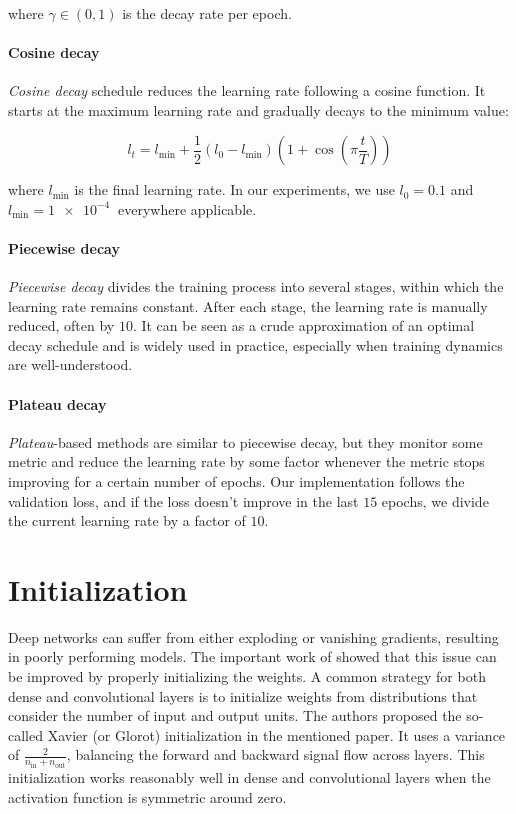where $\gamma \in (0,1)$ is the decay rate per epoch.

\paragraph{Cosine decay}
\emph{Cosine decay} schedule reduces the learning rate following a cosine function. It starts at the maximum learning rate and gradually decays to the minimum value:

\begin{equation} 
	\label{eq:cosine-decay} 
	l_t = l_{\mathrm{min}} + \frac{1}{2}(l_0 - l_{\mathrm{min}}) \left(1 + \cos\left( \pi \frac{t}{T} \right) \right)
\end{equation}

where $l_{\mathrm{min}}$ is the final learning rate. In our experiments, we use $l_0 = 0.1$ and $l_{\mathrm{min}} = \SI{1e-4}{}$ everywhere applicable.

\paragraph{Piecewise decay}
\emph{Piecewise decay} divides the training process into several stages, within which the learning rate remains constant. After each stage, the learning rate is manually reduced, often by $10$. It can be seen as a crude approximation of an optimal decay schedule and is widely used in practice, especially when training dynamics are well-understood.

\paragraph{Plateau decay}
\emph{Plateau}-based methods are similar to piecewise decay, but they monitor some metric and reduce the learning rate by some factor whenever the metric stops improving for a certain number of epochs. Our implementation follows the validation loss, and if the loss doesn't improve in the last $15$ epochs, we divide the current learning rate by a factor of $10$.

\section{Initialization}
\label{sec:init}

Deep networks can suffer from either exploding or vanishing gradients, resulting in poorly performing models. The important work of \cite{glorot2010understanding} showed that this issue can be improved by properly initializing the weights. A common strategy for both dense and convolutional layers is to initialize weights from distributions that consider the number of input and output units. The authors proposed the so-called Xavier (or Glorot) initialization in the mentioned paper. It uses a variance of $\frac{2}{n_{\text{in}} + n_{\text{out}}}$, balancing the forward and backward signal flow across layers. This initialization works reasonably well in dense and convolutional layers when the activation function is symmetric around zero.

